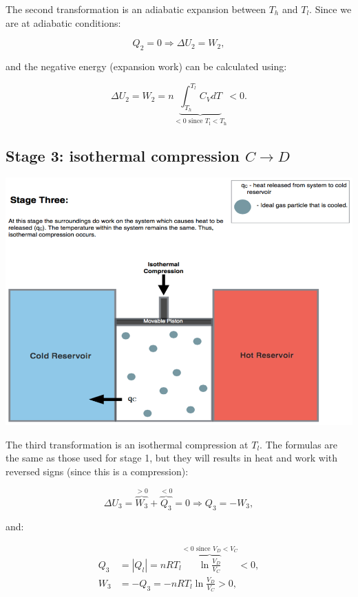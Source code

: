 \documentclass[
  9pt,
]{extbook}
\theoremstyle{definition}
\theoremstyle{definition}
\theoremstyle{definition}
\theoremstyle{remark}
\begin{document}
The second transformation is an adiabatic expansion between \(T_h\) and \(T_l\). Since we are at adiabatic conditions:

\begin{equation}
Q_2 = 0 \Rightarrow \Delta U_2 = W_2,
  \label{eq:CCst2}
\end{equation}

and the negative energy (expansion work) can be calculated using:

\begin{equation}
\Delta U_2 = W_2 = n \underbrace{\int_{T_h}^{T_l} C_V dT}_{<0 \text{ since } T_\mathrm{l}<T_\mathrm{h}} < 0.
  \label{eq:CCst2b}
\end{equation}

\hypertarget{CCstage3}{%
\subsection{\texorpdfstring{Stage 3: isothermal compression \(C \rightarrow D\)}{Stage 3: isothermal compression C \textbackslash rightarrow D}}\label{CCstage3}}

\begin{center}\includegraphics[width=0.7\linewidth]{./img/OEP_Figures.007c} \end{center}

The third transformation is an isothermal compression at \(T_l\). The formulas are the same as those used for stage 1, but they will results in heat and work with reversed signs (since this is a compression):

\begin{equation}
\Delta U_3 = \overbrace{W_3}^{>0} + \overbrace{Q_3}^{<0} = 0 \Rightarrow Q_3 = -W_3,
  \label{eq:CCst3}
\end{equation}

and:

\begin{equation}
\begin{aligned}
 Q_3 & = \left| Q_l \right|  = nRT_l \overbrace{\ln \frac{V_D}{V_C}}^{<0 \text{ since } V_D<V_C} < 0 , \\
 W_3 & = -Q_3 = - nRT_l \ln \frac{V_D}{V_C} > 0,
\end{aligned}
  \label{eq:CCst3b}
\end{equation}
\end{document}
